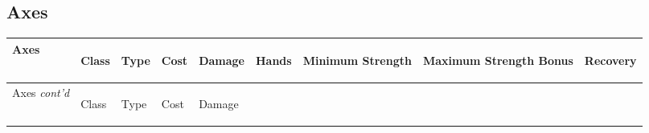 \documentclass[twoside]{book}
\begin{document}
    

\subsection{Axes}
    
\begin{longtable}{p{1.25in}llllp{2em}p{3em}p{3em}l} 
  Axes
  &
  \begin{turn}{70}{Class}\end{turn}
          
  &
  \begin{turn}{70}{Type}\end{turn}
          
  &
  \begin{turn}{70}{Cost}\end{turn}
          
  &
  \begin{turn}{70}{Damage}\end{turn}
          
  &
  \begin{turn}{70}{Hands}\end{turn}
          
  &
  \begin{turn}{70}{Minimum Strength}\end{turn}
          
  &
  \begin{turn}{70}{Maximum Strength Bonus}\end{turn}
          
  &
  \begin{turn}{70}{Recovery}\end{turn}
          
  \\
  \hline
  \hline
  \endfirsthead
  Axes \textit{cont'd}
        
  &
  \begin{turn}{70}{Class}\end{turn}
          
  &
  \begin{turn}{70}{Type}\end{turn}
          
  &
  \begin{turn}{70}{Cost}\end{turn}
          
  &
  \begin{turn}{70}{Damage}\end{turn}
          

\end{longtable}
\end{document}
